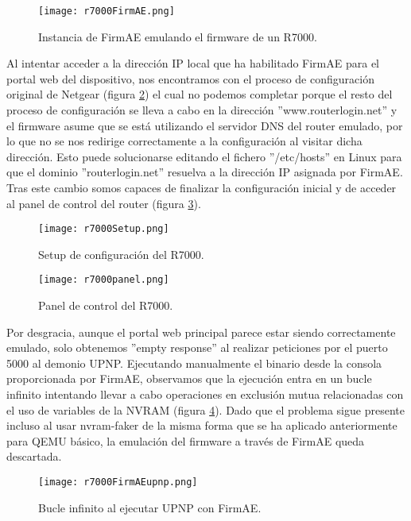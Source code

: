 \begin{figure}[H]
    \centering
    \texttt{[image: r7000FirmAE.png]}
    \caption{Instancia de FirmAE emulando el firmware de un R7000.}
    \label{fig:R7000FirmAE}
\end{figure}

Al intentar acceder a la dirección IP local que ha habilitado FirmAE para el portal web del dispositivo, nos encontramos con el proceso de 
configuración original de Netgear (figura \ref{fig:R7000Setup}) el cual no podemos completar porque el resto del proceso de configuración se lleva a cabo
en la dirección ''www.routerlogin.net'' y el firmware asume que se está utilizando el servidor DNS del router emulado, por lo que no se nos redirige 
correctamente a la configuración al visitar dicha dirección. Esto puede solucionarse editando el fichero ''/etc/hosts'' en Linux para que 
el dominio ''routerlogin.net'' resuelva a la dirección IP asignada por FirmAE. Tras este cambio somos capaces de finalizar la configuración inicial 
y de acceder al panel de control del router (figura \ref{fig:R7000panel}). 

\begin{figure}[H]
    \centering
    \texttt{[image: r7000Setup.png]}
    \caption{Setup de configuración del R7000.}
    \label{fig:R7000Setup}
\end{figure}

\begin{figure}[H]
    \centering
    \texttt{[image: r7000panel.png]}
    \caption{Panel de control del R7000.}
    \label{fig:R7000panel}
\end{figure}

Por desgracia, aunque el portal web principal parece estar siendo correctamente emulado, solo obtenemos ''empty response'' al realizar peticiones
por el puerto 5000 al demonio UPNP. Ejecutando manualmente el binario desde la consola proporcionada por FirmAE, observamos que la ejecución 
entra en un bucle infinito intentando llevar a cabo operaciones en exclusión mutua relacionadas con el uso de variables de la NVRAM 
(figura \ref{fig:R7000FirmAEupnp}). Dado que el problema sigue presente incluso al usar nvram-faker\cite{nvram} de la misma forma que se ha aplicado anteriormente para QEMU básico, la emulación del firmware
a través de FirmAE queda descartada.

\begin{figure}[H]
    \centering
    \texttt{[image: r7000FirmAEupnp.png]}
    \caption{Bucle infinito al ejecutar UPNP con FirmAE.}
    \label{fig:R7000FirmAEupnp}
\end{figure}

